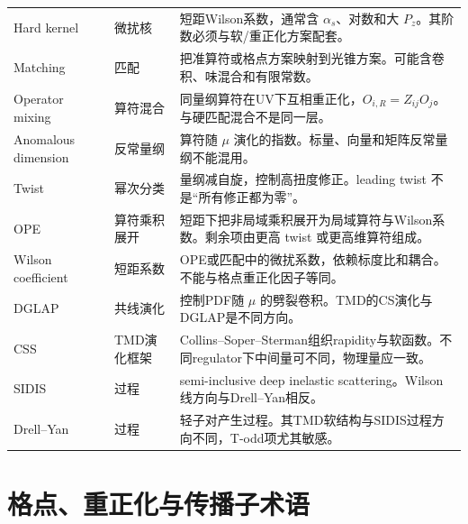 \documentclass[UTF8,12pt,a4paper,twoside,openany]{ctexbook}
\begin{document}
{\begin{longtable}{L{2.8cm}L{1.9cm}L{8.7cm}}
Hard kernel & 微扰核 & 短距Wilson系数，通常含 \(\alpha_s\)、对数和大 \(P_z\)。其阶数必须与软/重正化方案配套。 \\
Matching & 匹配 & 把准算符或格点方案映射到光锥方案。可能含卷积、味混合和有限常数。 \\
Operator mixing & 算符混合 & 同量纲算符在UV下互相重正化，\(O_{i,R}=Z_{ij}O_j\)。与硬匹配混合不是同一层。 \\
Anomalous dimension & 反常量纲 & 算符随 \(\mu\) 演化的指数。标量、向量和矩阵反常量纲不能混用。 \\
Twist & 幂次分类 & 量纲减自旋，控制高扭度修正。leading twist 不是“所有修正都为零”。 \\
OPE & 算符乘积展开 & 短距下把非局域乘积展开为局域算符与Wilson系数。剩余项由更高 twist 或更高维算符组成。 \\
Wilson coefficient & 短距系数 & OPE或匹配中的微扰系数，依赖标度比和耦合。不能与格点重正化因子等同。 \\
DGLAP & 共线演化 & 控制PDF随 \(\mu\) 的劈裂卷积。TMD的CS演化与DGLAP是不同方向。 \\
CSS & TMD演化框架 & Collins--Soper--Sterman组织rapidity与软函数。不同regulator下中间量可不同，物理量应一致。 \\
SIDIS & 过程 & semi-inclusive deep inelastic scattering。Wilson线方向与Drell--Yan相反。 \\
Drell--Yan & 过程 & 轻子对产生过程。其TMD软结构与SIDIS过程方向不同，T-odd项尤其敏感。 \\
\end{longtable}
}

\section{格点、重正化与传播子术语}
\end{document}
